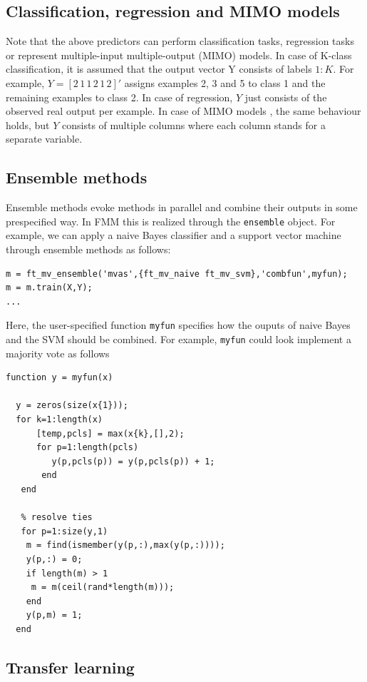 \documentclass{article}
\renewcommand{\t}[1]{{\tt #1}}
\begin{document}
\subsection{Classification, regression and MIMO models}

Note that the above predictors can perform classification tasks, regression tasks or represent multiple-input multiple-output (MIMO) models. In case of K-class classification, it is assumed that the output vector Y consists of labels $1:K$. For example, $Y = [2\,1\, 1\, 2\, 1\, 2]'$ assigns examples 2, 3 and 5 to class 1 and the remaining examples to class 2. In case of regression, $Y$ just consists of the observed real output per example. In case of MIMO models , the same behaviour holds, but $Y$ consists of multiple columns where each column stands for a separate variable.

\subsection{Ensemble methods}

Ensemble methods evoke methods in parallel and combine their outputs in some prespecified way. In FMM this is realized through the \t{ensemble} object. For example, we can apply a naive Bayes classifier and a support vector machine through ensemble methods as follows:
\begin{verbatim}
m = ft_mv_ensemble('mvas',{ft_mv_naive ft_mv_svm},'combfun',myfun);
m = m.train(X,Y);
...
\end{verbatim}
Here, the user-specified function \t{myfun} specifies how the ouputs of naive Bayes and the SVM should be combined. For example, \t{myfun} could look implement a majority vote as follows
\begin{verbatim}
function y = myfun(x)

  y = zeros(size(x{1}));
  for k=1:length(x)
      [temp,pcls] = max(x{k},[],2);
      for p=1:length(pcls)
         y(p,pcls(p)) = y(p,pcls(p)) + 1;
       end
   end
            
   % resolve ties
   for p=1:size(y,1)
    m = find(ismember(y(p,:),max(y(p,:))));
    y(p,:) = 0;
    if length(m) > 1
     m = m(ceil(rand*length(m)));
    end
    y(p,m) = 1;
  end
\end{verbatim}


\subsection{Transfer learning}
\end{document}
